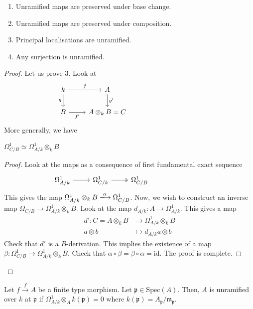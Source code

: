 \documentclass[oneside, 12pt, ]{scrbook}
\newcommand{\spec}{\mathrm{Spec}}
\newcommand{\pr}{\mathfrak{p}}
\newcommand{\m}{\mathfrak{m}}
\newcommand{\id}{\mathrm{id}}
\theoremstyle{theorem}
\begin{document}
\begin{proposition}
\begin{enumerate}
\item Unramified maps are preserved under base change.
\item Unramified maps are preserved under composition.
\item Principal localisations are unramified.
\item Any surjection is unramified.
\end{enumerate}
\end{proposition}

\begin{proof}
Let us prove $3$. Look at 
\[\begin{tikzcd}
	k & A &&&& {} \\
	B & {A\otimes_{k}B=C}
	\arrow["f", from=1-1, to=1-2]
	\arrow["g"', from=1-1, to=2-1]
	\arrow["{f'}"', from=2-1, to=2-2]
	\arrow["{g'}", from=1-2, to=2-2]
\end{tikzcd}\]
More generally, we have 
\begin{lemma}
$\Omega_{C/B}^1 \simeq \Omega_{A/k}^1 \otimes_{k}B$
\end{lemma}

\begin{proof}
Look at the maps as a consequence of first fundamental exact sequence
\[\begin{tikzcd}
	{\Omega_{A/k}^1} & {\Omega_{C/k}^1} & {\Omega_{C/B}^1} &&& {}
	\arrow[from=1-1, to=1-2]
	\arrow[two heads, from=1-2, to=1-3]
\end{tikzcd}\]
This gives the map $\Omega_{A/k}^1 \otimes_{k} B \xlongrightarrow{\alpha} \Omega_{C/B}^1$. Now, we wish to construct an inverse map $\Omega_{C/B} \rightarrow \Omega_{A/k}^1 \otimes_{k} B$. Look at the map $d_{A/k} : A \rightarrow \Omega_{A/k}^1$. This gives a map 
\begin{align*}
d' : C= A\otimes_{k} B &\rightarrow \Omega_{A/k}^1 \otimes_{k} B \\
a\otimes b &\mapsto d_{A/k} a \otimes b
\end{align*}
Check that $d'$ is a $B$-derivation. This implies the existence of a map $\beta : \Omega_{C/B}^1 \rightarrow \Omega_{A/k}^1 \otimes_{k} B$. Check that $\alpha \circ \beta = \beta \circ \alpha = \id$. The proof is complete.
\end{proof}
\end{proof}

\begin{lemma}
Let $f \xrightarrow{f} A$ be a finite type morphism. Let $\pr \in \spec(A)$. Then, $A$ is unramified over $k$ at $\pr$ if $\Omega_{A/k}^1 \otimes_{A} k(\pr) = 0$ where $k(\pr) = A_{\pr} / \m_{\pr}$.
\end{lemma}
\end{document}
